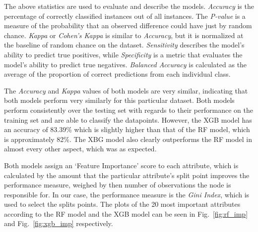 \documentclass[runningheads]{llncs}
\begin{document}
The above statistics are used to evaluate and describe the models.
\emph{Accuracy} is the percentage of correctly classified instances out
of all instances. The \emph{P-value} is a measure of the probability
that an observed difference could have just by random chance.
\emph{Kappa} or \emph{Cohen's Kappa} is similar to \emph{Accuracy}, but
it is normalized at the baseline of random chance on the dataset.
\emph{Sensitivity} describes the model's ability to predict true
positives, while \emph{Specificity} is a metric that evaluates the
model's ability to predict true negatives. \emph{Balanced Accuracy} is
calculated as the average of the proportion of correct predictions from
each individual class.

The \emph{Accuracy} and \emph{Kappa} values of both models are very
similar, indicating that both models perform very similarly for this
particular dataset. Both models perform consistently over the testing
set with regards to their performance on the training set and are able
to classify the datapoints. However, the XGB model has an accuracy of
83.39\% which is slightly higher than that of the RF model, which is
approximately 82\%. The XBG model also clearly outperforms the RF model
in almost every other aspect, which was as expected.

Both models assign an `Feature Importance' score to each attribute,
which is calculated by the amount that the particular attribute's split
point improves the performance measure, weighed by then number of
observations the node is responsible for. In our case, the performance
measure is the \emph{Gini Index}, which is used to select the splits
points. The plots of the 20 most important attributes according to the
RF model and the XGB model can be seen in Fig.~\ref{fig:rf_imp} and
Fig.~\ref{fig:xgb_imp} respectively.
\end{document}
